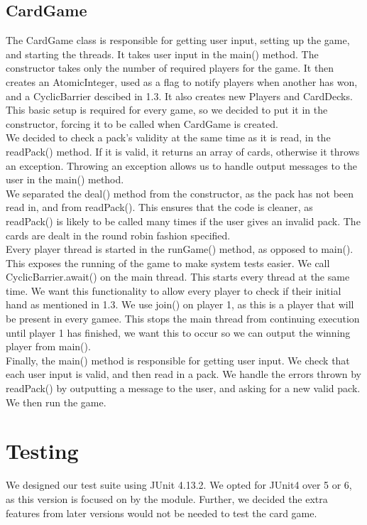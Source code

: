\documentclass[11p]{article}
\begin{document}
\subsection{CardGame}
The CardGame class is responsible for getting user input, setting up the game, and starting the threads. It takes user input in the main() method. The constructor takes only the number of required players for the game. It then creates an AtomicInteger, used as a flag to notify players when another has won, and a CyclicBarrier descibed in 1.3. It also creates new Players and CardDecks. This basic setup is required for every game, so we decided to put it in the constructor, forcing it to be called when CardGame is created.\\
We decided to check a pack's validity at the same time as it is read, in  the readPack() method. If it is valid, it returns an array of cards, otherwise it throws an exception. Throwing an exception allows us to handle output messages to the user in the main() method.\\
We separated the deal() method from the constructor, as the pack has not been read in, and from readPack(). This ensures that the code is cleaner, as readPack() is likely to be called many times if the user gives an invalid pack. The cards are dealt in the round robin fashion specified.\\
Every player thread is started in the runGame() method, as opposed to main(). This exposes the running of the game to make system tests easier. We call CyclicBarrier.await() on the main thread. This starts every thread at the same time. We want this functionality to allow every player to check if their initial hand as mentioned in 1.3.  We use join() on player 1, as this is a player that will be present in every gamee. This stops the main thread from continuing execution until player 1 has finished, we want this to occur so we can output the winning player from main().\\
Finally, the main() method is responsible for getting user input. We check that each user input is valid, and then read in a pack. We handle the errors thrown by readPack() by outputting a message to the user, and asking for a new valid pack. We then run the game.

\section{Testing}
We designed our test suite using JUnit 4.13.2. We opted for JUnit4 over 5 or 6, as this version is focused on by the module. Further, we decided the extra features from later versions would not be needed to test the card game.
\end{document}
